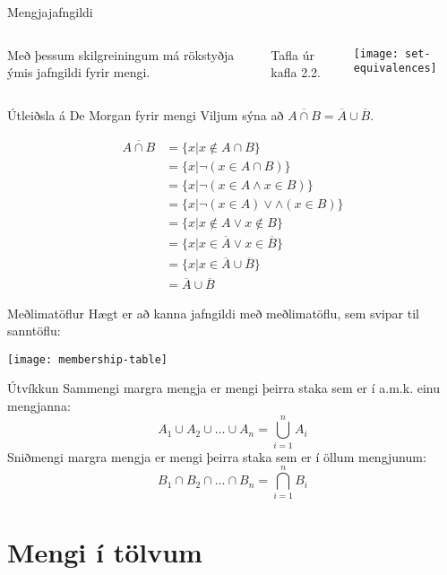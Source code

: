 \documentclass{beamer}
\begin{document}
\begin{frame}{Mengjajafngildi}
\begin{columns}
Með þessum skilgreiningum má rökstyðja ýmis jafngildi fyrir mengi.

\vspace*{0.5cm}
Tafla úr kafla 2.2.
\begin{center}
\texttt{[image: set-equivalences]}
\end{center}
\end{columns}
\end{frame}

\begin{frame}{Útleiðsla á De Morgan fyrir mengi}
Viljum sýna að $\overline{A \cap B} = \overline{A} \cup \overline{B}$.

\begin{align*}
\overline{A \cap B} &= \{x | x \notin A \cap B\}\\ 
&= \{x | \lnot ( x \in A \cap B)\}\\ 
&= \{x | \lnot ( x \in A \land x \in B)\}\\ 
&= \{x | \lnot ( x \in A) \lor \land (x \in B)\}\\ 
&= \{x | x \notin A \lor x \notin B\}\\ 
&= \{x | x \in \overline{A} \lor x \in \overline{B}\}\\ 
&= \{x | x \in \overline{A} \cup \overline{B}\}\\ 
&= \overline{A} \cup \overline{B}
\end{align*}
\end{frame}

\begin{frame}{Meðlimatöflur}
Hægt er að kanna jafngildi með meðlimatöflu, sem svipar til sanntöflu:
\begin{center}
\texttt{[image: membership-table]}
\end{center}
\end{frame}

\begin{frame}{Útvíkkun}
Sammengi margra mengja er mengi þeirra staka sem er í a.m.k. einu mengjanna:
\[
 A_1 \cup A_2 \cup \ldots \cup A_n = \bigcup_{i=1}^n A_i
\]
Sniðmengi margra mengja er mengi þeirra staka sem er í öllum mengjunum:
\[
 B_1 \cap B_2 \cap \ldots \cap B_n = \bigcap_{i=1}^n B_i
\]
\end{frame}

\section{Mengi í tölvum}
\end{document}
